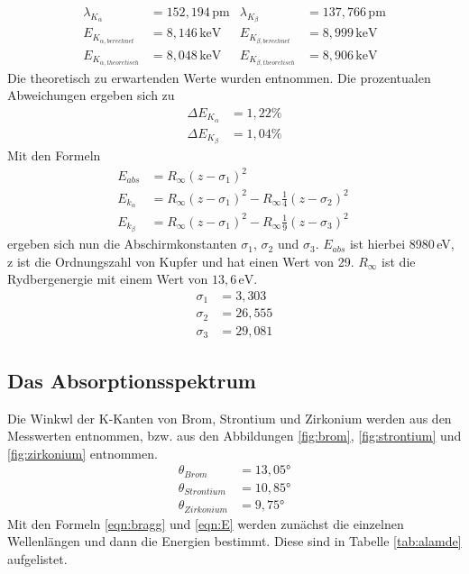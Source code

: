 \begin{align*}
  \lambda_{K_{\alpha}} &= 152,194 \, \mathrm{pm} & \lambda_{K_{\beta}} &= 137,766\, \mathrm{pm} \\
  E_{K_{\alpha, berechnet}} &= 8,146\, \mathrm{keV} &  E_{K_{\beta, berechnet}} &= 8,999\, \mathrm{keV} \\
  E_{K_{\alpha, theoretisch}} &= 8,048\, \mathrm{keV} & E_{K_{\beta, theoretisch}} &= 8,906\, \mathrm{keV} %
\end{align*}
Die theoretisch zu erwartenden Werte wurden \cite{wert} entnommen.
Die prozentualen Abweichungen ergeben sich zu
\begin{align}
  \Delta E_{K_{\alpha}} &= 1,22\%\\
  \Delta E_{K_{\beta}} &= 1,04\%
\end{align}
Mit den Formeln
\begin{align}
  E_{abs}&= R_{\infty}(z-\sigma_1)^2\\
  E_{k_\alpha} &= R_{\infty}(z-\sigma_1)^2-R_{\infty}\frac{1}{4}(z-\sigma_2)^2\\
  E_{k_\beta} &= R_{\infty}(z-\sigma_1)^2-R_{\infty}\frac{1}{9}(z-\sigma_3)^2\
\end{align}
ergeben sich nun die Abschirmkonstanten $\sigma_1$, $\sigma_2$ und $\sigma_3$.
$E_{abs}$ ist hierbei 8980\,eV,
z ist die Ordnungszahl von Kupfer und hat einen Wert von 29.\cite{Z}
$R_{\infty}$ ist die Rydbergenergie mit einem Wert von $13,6\, \mathrm{eV}$.\cite{Anleitung}
\begin{align}
  \sigma_1 &= 3,303\\
  \sigma_2 &= 26,555\\
  \sigma_3 &= 29,081
\end{align}






\subsection{Das Absorptionsspektrum}
Die Winkwl der K-Kanten von Brom, Strontium und Zirkonium werden aus den Messwerten entnommen,
bzw. aus den Abbildungen \ref{fig:brom}, \ref{fig:strontium} und \ref{fig:zirkonium} entnommen.
\begin{align*}
\theta_{Brom} &= 13,05°\\
\theta_{Strontium} &= 10,85°\\
\theta_{Zirkonium} &= 9,75°
\end{align*}
Mit den Formeln \ref{eqn:bragg} und \ref{eqn:E} werden zunächst die einzelnen Wellenlängen
und dann die Energien bestimmt.
Diese sind in Tabelle \ref{tab:alamde} aufgelistet.

